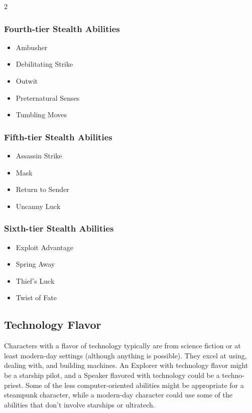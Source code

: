 \begin{multicols}{2}
\subsubsection{Fourth-tier Stealth Abilities}

\begin{itemize} 
\item Ambusher
\item Debilitating Strike
\item Outwit
\item Preternatural Senses
\item Tumbling Moves
\end{itemize}

\subsubsection{Fifth-tier Stealth Abilities}

\begin{itemize} 
\item Assassin Strike
\item Mask
\item Return to Sender
\item Uncanny Luck
\end{itemize}

\subsubsection{Sixth-tier Stealth Abilities}

\begin{itemize} 
\item Exploit Advantage
\item Spring Away
\item Thief’s Luck
\item Twist of Fate
\end{itemize}

\subsection{Technology Flavor}

Characters with a flavor of technology typically are from science fiction or at least modern-day settings (although anything is possible). They excel at using, dealing with, and building machines. An Explorer with technology flavor might be a starship pilot, and a Speaker flavored with technology could be a techno-priest.
Some of the less computer-oriented abilities might be appropriate for a steampunk character, while a modern-day character could use some of the abilities that don’t involve starships or ultratech.


\end{multicols}
